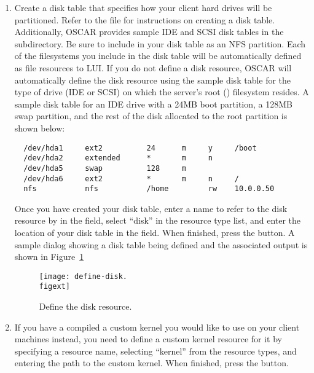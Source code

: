 \begin{enumerate}
\item {} Create a disk table that specifies
  how your client hard drives will be partitioned. Refer to the
   file for instructions on creating
  a disk table. Additionally, OSCAR provides sample IDE and SCSI disk
  tables in the  subdirectory. Be sure to include
   in your disk table as an NFS partition. Each of the
  filesystems you include in the disk table will be automatically
  defined as file resources to LUI. If you do not define a disk
  resource, OSCAR will automatically define the disk resource using
  the sample disk table for the type of drive (IDE or SCSI) on which
  the server's root (\file{/}) filesystem resides. A sample disk table
  for an IDE drive with a 24MB boot partition, a 128MB swap partition,
  and the rest of the disk allocated to the root partition is shown
  below:

\begin{verbatim}
  /dev/hda1     ext2          24      m     y     /boot
  /dev/hda2     extended      *       m     n
  /dev/hda5     swap          128     m     
  /dev/hda6     ext2          *       m     n     /
  nfs           nfs           /home         rw    10.0.0.50
\end{verbatim}
    
  Once you have created your disk table, enter a name to refer to the
  disk resource by in the  field, select ``disk'' in the
  resource type list, and enter the location of your disk table in the
   field. When finished, press the
   button. A sample dialog showing a disk table being
  defined and the associated output is shown in
  Figure~\ref{fig:detailed-define-disk-resource}

  \begin{figure}[htbp]
    \begin{center}
      \texttt{[image: define-disk.\\figext]}
      \caption{Define the disk resource.}
      \label{fig:detailed-define-disk-resource}
    \end{center}
  \end{figure}
    
\item {}  If you have a compiled a custom kernel
  you would like to use on your client machines instead, you need to
  define a custom kernel resource for it by specifying a resource
  name, selecting ``kernel'' from the resource types, and entering the
  path to the custom kernel.  When finished, press the 
  button.
    

\end{enumerate}
